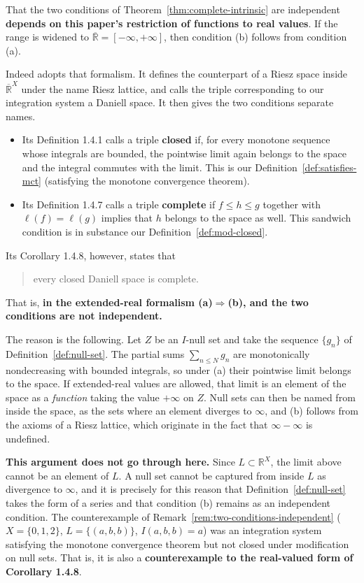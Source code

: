 \begin{remark}\label{rem:extended-real-collapse}
  That the two conditions of Theorem~\ref{thm:complete-intrinsic} are
  independent \textbf{depends on this paper's restriction of functions to real
  values}.
  If the range is widened to
  $\overline{\mathbb{R}}=[-\infty,+\infty]$, then condition (b) follows from
  condition (a).

  Indeed \cite{CWS} adopts that formalism.
  It defines the counterpart of a Riesz space inside
  $\overline{\mathbb{R}}^X$ under the name Riesz lattice, and calls the triple
  corresponding to our integration system a Daniell space.
  It then gives the two conditions separate names.
  \begin{itemize}
    \item Its Definition 1.4.1 calls a triple \textbf{closed} if, for every
      monotone sequence whose integrals are bounded, the pointwise limit again
      belongs to the space and the integral commutes with the limit.
      This is our Definition~\ref{def:satisfies-mct} (satisfying the monotone
      convergence theorem).
    \item Its Definition 1.4.7 calls a triple \textbf{complete} if
      $f\le h\le g$ together with $\ell(f)=\ell(g)$ implies that $h$ belongs to
      the space as well.
      This sandwich condition is in substance our
      Definition~\ref{def:mod-closed}.
  \end{itemize}
  Its Corollary 1.4.8, however, states that
  \begin{quote}
    every closed Daniell space is complete.
  \end{quote}
  That is, \textbf{in the extended-real formalism (a)$\Rightarrow$(b), and the
  two conditions are not independent.}

  The reason is the following. Let $Z$ be an $I$-null set and take the sequence
  $\{g_n\}$ of Definition~\ref{def:null-set}.
  The partial sums $\sum_{n\le N}g_n$ are monotonically nondecreasing with
  bounded integrals, so under (a) their pointwise limit belongs to the space.
  If extended-real values are allowed, that limit is an element of the space as
  a \emph{function} taking the value $+\infty$ on $Z$.
  Null sets can then be named from inside the space, as the sets where an
  element diverges to $\infty$, and (b) follows from the axioms of a Riesz
  lattice, which originate in the fact that $\infty-\infty$ is undefined.

  \textbf{This argument does not go through here.}
  Since $L\subset\mathbb{R}^X$, the limit above cannot be an element of $L$.
  A null set cannot be captured from inside $L$ as divergence to $\infty$, and
  it is precisely for this reason that
  Definition~\ref{def:null-set} takes the form of a series and that condition
  (b) remains as an independent condition.
  The counterexample of
  Remark~\ref{rem:two-conditions-independent} ($X=\{0,1,2\}$,
  $L=\{(a,b,b)\}$, $I(a,b,b)=a$) was an integration system satisfying the
  monotone convergence theorem but not closed under modification on null sets.
  That is, it is also a \textbf{counterexample to the real-valued form of
  Corollary 1.4.8}.


\end{remark}
